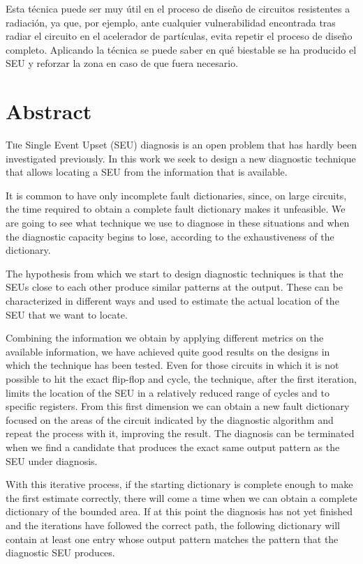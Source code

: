 Esta técnica puede ser muy útil en el proceso de diseño de circuitos resistentes a
radiación, ya que, por ejemplo, ante cualquier vulnerabilidad encontrada tras
radiar el circuito en el acelerador de partículas, evita repetir el proceso de
diseño completo. Aplicando la técnica se puede saber en qué biestable se ha
producido el \gls{SEU} y reforzar la zona en caso de que fuera necesario.


\chapter*{Abstract}
\pagestyle{especial}
{}

\lettrine[lraise=-0.1, lines=2, loversize=0.2]{T}{h}e Single Event Upset (SEU) 
diagnosis is an open problem that has hardly been investigated previously. In this
work we seek to design a new diagnostic technique that allows locating a SEU from 
the information that is available.

It is common to have only incomplete fault dictionaries, since, on large circuits,
the time required to obtain a complete fault dictionary makes it unfeasible. We 
are going to see what technique we use to diagnose in these situations and when 
the diagnostic capacity begins to lose, according to the exhaustiveness of the 
dictionary.

The hypothesis from which we start to design diagnostic techniques is that the 
SEUs close to each other produce similar patterns at the output. These can be 
characterized in different ways and used to estimate the actual location of the 
SEU that we want to locate.

Combining the information we obtain by applying different metrics on the available
information, we have achieved quite good results on the designs in which the 
technique has been tested. Even for those circuits in which it is not possible to 
hit the exact flip-flop and cycle, the technique, after the first iteration, 
limits the location of the SEU in a relatively reduced range of cycles and to 
specific registers. From this first dimension we can obtain a new fault dictionary
focused on the areas of the circuit indicated by the diagnostic algorithm and 
repeat the process with it, improving the result. The diagnosis can be terminated 
when we find a candidate that produces the exact same output pattern as the SEU 
under diagnosis.

With this iterative process, if the starting dictionary is complete enough to make
the first estimate correctly, there will come a time when we can obtain a complete
dictionary of the bounded area. If at this point the diagnosis has not yet finished
and the iterations have followed the correct path, the following dictionary will 
contain at least one entry whose output pattern matches the pattern that the 
diagnostic SEU produces.

